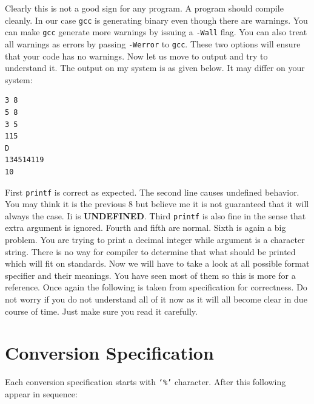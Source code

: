Clearly this is not a good sign for any program. A program should compile
cleanly. In our case \texttt{gcc} is generating binary even though there are
warnings. You can make \texttt{gcc} generate more warnings by issuing a
\texttt{-Wall} flag. You can also treat all warnings as errors by passing
\texttt{-Werror} to \texttt{gcc}. These two options will ensure that your code
has no warnings. Now let us move to output and try to understand it. The output
on my system is as given below. It may differ on your system:

\begin{Verbatim}[frame=single]
3 8
5 8
3 5
115
D
134514119
10
\end{Verbatim}

First \texttt{printf} is correct as expected. The second line causes undefined
behavior. You may think it is the previous 8 but believe me it is not
guaranteed that it will always the case. Ii is \textbf{UNDEFINED}. Third
\texttt{printf} is also fine in the sense that extra argument is
ignored. Fourth and fifth are normal. Sixth is again a big problem. You are
trying to print a decimal integer while argument is a character string. There
is no way for compiler to determine that what should be printed which will fit
on standards. Now we will have to take a look at all possible format specifier
and their meanings. You have seen most of them so this is more for a
reference. Once again the following is taken from specification for
correctness. Do not worry if you do not understand all of it now as it will all
become clear in due course of time. Just make sure you read it carefully.

\section{Conversion Specification}
Each conversion specification starts with \texttt{`\%'} character. After this
following appear in sequence:

